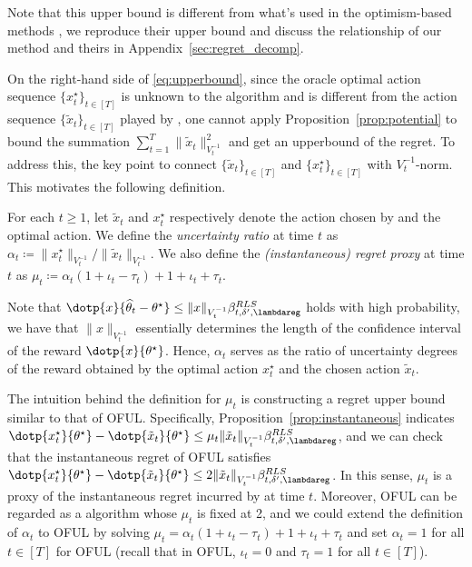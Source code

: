 Note that this upper bound is different from what's used in the optimism-based methods \citep{abbasi2011improved,agrawal2013thompson,abeille2017linear}, we reproduce their upper bound and discuss the relationship of our method and theirs in Appendix~\ref{sec:regret_decomp}.



On the right-hand side of \eqref{eq:upperbound}, since the oracle optimal action sequence  $\{x^{\star}_t\}_{t\in[T]}$ is unknown to the algorithm and is different from the action sequence  $\{\tilde{x}_t\}_{t\in[T]}$ played by \POFUL{}, one cannot apply Proposition~\ref{prop:potential} to bound the summation $\sum_{t=1}^T \|\tilde{x}_t\|_{V_t^{-1}}^2 $ and get an upperbound of the regret. To address this,  the key point to connect  $\{\tilde{x}_t\}_{t\in[T]}$ and $\{x^{\star}_t\}_{t\in[T]}$ with $V_t^{-1}$-norm. This motivates the following definition.

\begin{definition}
	For each $t\geq 1$, let $\tilde{x}_t$ and $x_t^\star$ respectively denote the action chosen by \POFUL{} and the optimal action.  We define the \emph{uncertainty ratio} at time $t$ as $\alpha_t \coloneqq \|x_t^\star\|_{V_t^{-1}}/\|\tilde{x}_t\|_{V_t^{-1}}    $. We also define the \emph{(instantaneous) regret proxy} at time $t$ as $\mu_t  \coloneqq  \alpha_t(1+\iota_t -\tau_t)+1+\iota_t+\tau_t$. 

	

\end{definition}

Note that $ \dotp{x}{\widehat{\theta}_t-\theta^{\star}}\leq\|x\|_{V_t^{-1}} \beta_{t,\delta^\prime, \lambdareg}^{RLS}
$ holds with high probability, we have that $\|x\|_{V_t^{-1}} $ essentially determines the length of the confidence interval of the reward $\dotp{x}{\theta^{\star}}$.  Hence, $\alpha_t$ serves as the ratio of uncertainty degrees of the reward obtained by the optimal action $x^{\star}_t$ and the chosen action $\tilde{x}_t$.


 
The intuition behind the definition for $\mu_t$ is constructing a regret upper bound similar to that of OFUL.  Specifically,  Proposition~\ref{prop:instantaneous} indicates
$ \dotp{x_t^\star}{ \theta^{\star}}-\dotp{\tilde{x}_t}{\theta^{\star}} \leq \mu_t  \|\tilde{x}_t\|_{V_t^{-1}} \beta^{RLS}_{t,\delta^\prime, \lambdareg}
$,
and we can check that the instantaneous regret of OFUL satisfies 
$\dotp{x_t^\star}{ \theta^{\star}}-\dotp{\tilde{x}_t}{\theta^{\star}} \leq 2\|\tilde{x}_t\|_{V_t^{-1}}   \beta^{RLS}_{t,\delta^\prime, \lambdareg}$. In this sense, $\mu_t$ is a proxy of the instantaneous regret incurred by \POFUL{} at time $t$. Moreover, OFUL can be regarded as a \POFUL{} algorithm whose $\mu_t$ is fixed at 2, and we could extend the definition of $\alpha_t$ to OFUL by solving $\mu_t  =  \alpha_t(1+\iota_t -\tau_t)+1+\iota_t+\tau_t$ and set $\alpha_t =  1 $ for all $t\in [T]$ for OFUL (recall that in OFUL, $\iota_t = 0$ and $\tau_t = 1$ for all $t \in [T]$). 

